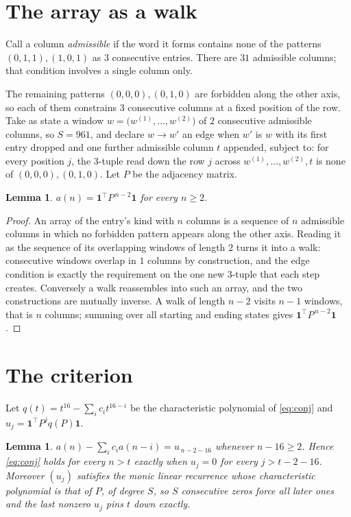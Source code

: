 \documentclass[11pt,a4paper]{article}
\theoremstyle{plain}
\newtheorem{lemma}[theorem]{Lemma}
\theoremstyle{definition}
\begin{document}
\section{The array as a walk}

Call a column \emph{admissible} if the word it forms contains none of the patterns
$(0,1,1), (1,0,1)$ as $3$ consecutive entries. There are $31$ admissible columns; that condition
involves a single column only.

The remaining patterns $(0,0,0), (0,1,0)$ are forbidden along the other axis, so each of them
constrains $3$ consecutive columns at a fixed position of the row. Take as state a
window $w=\bigl(w^{(1)},\dots,w^{(2)}\bigr)$ of $2$ consecutive admissible
columns, so $S=961$, and declare $w\to w'$ an edge when $w'$ is $w$ with its first entry
dropped and one further admissible column $t$ appended, subject to: for every position
$j$, the $3$-tuple read down the row $j$ across $w^{(1)},\dots,w^{(2)},t$
is none of $(0,0,0), (0,1,0)$. Let $P$ be the adjacency matrix.

\begin{lemma}\label{lem:walk}
$a(n)=\mathbf{1}^{\!\top}P^{\,n-2}\mathbf{1}$ for every $n\ge2$.
\end{lemma}

\begin{proof}
An array of the entry's kind with $n$ columns is a sequence of $n$ admissible columns in
which no forbidden pattern appears along the other axis. Reading it as the sequence of its
overlapping windows of length $2$ turns it into a walk: consecutive windows overlap in
$1$ columns by construction, and the edge condition is exactly the requirement on the one
new $3$-tuple that each step creates. Conversely a walk reassembles into such an array,
and the two constructions are mutually inverse. A walk of length $n-2$ visits $n-1$
windows, that is $n$ columns; summing over all starting and ending states gives
$\mathbf{1}^{\!\top}P^{\,n-2}\mathbf{1}$.
\end{proof}

\section{The criterion}

Let $q(t)=t^{16}-\sum_i c_i t^{16-i}$ be the characteristic polynomial of
\eqref{eq:conj} and $u_j=\mathbf{1}^{\!\top}P^{j}q(P)\mathbf{1}$.

\begin{lemma}\label{lem:crit}
$a(n)-\sum_i c_i a(n-i)=u_{\,n-2-16}$ whenever $n-16\ge2$. Hence
\eqref{eq:conj} holds for every $n>t$ exactly when $u_j=0$ for every
$j>t-2-16$. Moreover $(u_j)$ satisfies the monic linear recurrence whose
characteristic polynomial is that of $P$, of degree $S$, so $S$ consecutive zeros force all
later ones and the last nonzero $u_j$ pins $t$ down exactly.
\end{lemma}
\end{document}
